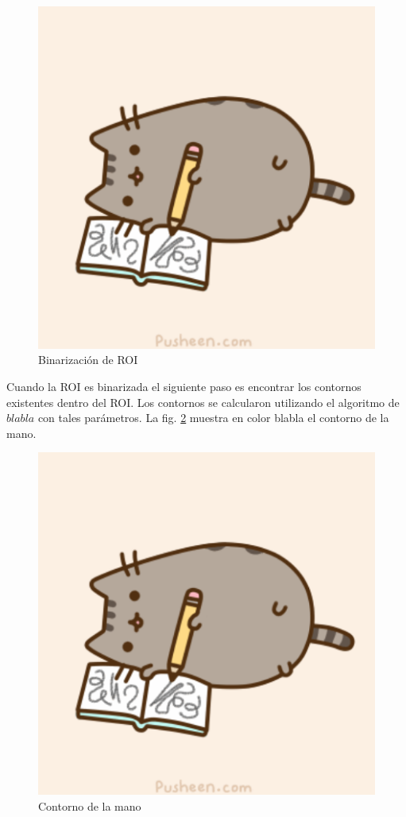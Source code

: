 \begin{figure}[h!]
\begin{center}
\includegraphics[scale=.5]{./Figures/pusheen.png}
\end{center}
\caption{Binarización de ROI}
\label{fig:BinarizationRoi}
\end{figure}
 
Cuando la ROI es binarizada el siguiente paso es encontrar los contornos existentes dentro del ROI. Los contornos se calcularon utilizando el algoritmo de $blabla$ con tales parámetros. La fig. \ref{fig:ImageHandContour} muestra en color blabla el contorno de la mano. 

\begin{figure}[!h]
\begin{center}
\includegraphics[scale=.5]{./Figures/pusheen.png}
\end{center}
\caption{Contorno de la mano}
\label{fig:ImageHandContour}
\end{figure}
  



